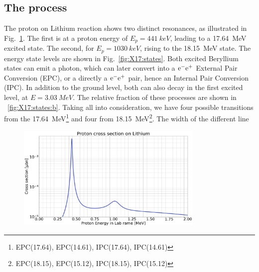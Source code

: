 \begin{refsection}
    \subsection{The process}
        The proton on Lithium reaction shows two distinct resonances, as illustrated in Fig.~\ref{fig:X17:resonance}.
        The first is at a proton energy of $E_p=\SI{441}{keV}$, leading to a \SI{17.64}{MeV} excited state.
        The second, for $E_p=\SI{1030}{keV}$, rising to the \SI{18.15}{MeV} state.
        The energy state levels are shown in Fig.~\ref{fig:X17:states}.
        Both excited Beryllium states can emit a photon, which can later convert into a $\text{e}^-\text{e}^+$ External Pair Conversion (EPC), or a directly a $\text{e}^-\text{e}^+$ pair, hence an Internal Pair Conversion (IPC).
        In addition to the ground level, both can also decay in the first excited level, at $E=\SI{3.03}{MeV}$.
        The relative fraction of these processes are shown in ~\ref{fig:X17:states:b}.
        Taking all into consideration, we have four possible transitions from the \SI{17.64}{MeV}\footnote{EPC(17.64), EPC(14.61), IPC(17.64), IPC(14.61)} and four from \SI{18.15}{MeV}\footnote{EPC(18.15), EPC(15.12), IPC(18.15), IPC(15.12)}. 
        The width of the different line 
        \begin{figure}
            \centering
            \includegraphics[width = 0.8\textwidth]{Figures/X17/pLi_crossection.png}
            \caption{}
            \label{fig:X17:resonance}
        \end{figure}
        

\end{refsection}
